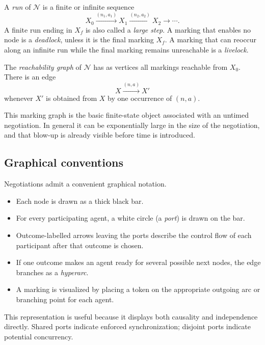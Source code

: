 \begin{definition}
A \emph{run} of $\mathcal{N}$ is a finite or infinite sequence
\[
X_0 \xrightarrow{(n_1,a_1)} X_1 \xrightarrow{(n_2,a_2)} X_2 \xrightarrow{} \cdots .
\]
A finite run ending in $X_f$ is also called a \emph{large step}. A marking that enables no node is a \emph{deadlock}, unless it is the final marking $X_f$. A marking that can reoccur along an infinite run while the final marking remains unreachable is a \emph{livelock}.
\end{definition}

\begin{definition}
The \emph{reachability graph} of $\mathcal{N}$ has as vertices all markings reachable from $X_0$. There is an edge
\[
X \xrightarrow{(n,a)} X'
\]
whenever $X'$ is obtained from $X$ by one occurrence of $(n,a)$.
\end{definition}

This marking graph is the basic finite-state object associated with an untimed negotiation. In general it can be exponentially large in the size of the negotiation, and that blow-up is already visible before time is introduced.

\subsection{Graphical conventions}
\label{subsec:prelim-neg-graphics}

Negotiations admit a convenient graphical notation.
\begin{itemize}
    \item Each node is drawn as a thick black bar.
    \item For every participating agent, a white circle (a \emph{port}) is drawn on the bar.
    \item Outcome-labelled arrows leaving the ports describe the control flow of each participant after that outcome is chosen.
    \item If one outcome makes an agent ready for several possible next nodes, the edge branches as a \emph{hyperarc}.
    \item A marking is visualized by placing a token on the appropriate outgoing arc or branching point for each agent.
\end{itemize}

This representation is useful because it displays both causality and independence directly. Shared ports indicate enforced synchronization; disjoint ports indicate potential concurrency.

